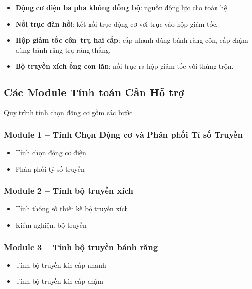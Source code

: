 \begin{itemize}
    \item \textbf{Động cơ điện ba pha không đồng bộ}: nguồn động lực cho toàn hệ.
    \item \textbf{Nối trục đàn hồi}: kết nối trục động cơ với trục vào hộp giảm tốc.
    \item \textbf{Hộp giảm tốc côn--trụ hai cấp}: cấp nhanh dùng bánh răng côn,
            cấp chậm dùng bánh răng trụ răng thẳng.
    \item \textbf{Bộ truyền xích ống con lăn}: nối trục ra hộp giảm tốc với thùng trộn.
\end{itemize}


\subsection{Các Module Tính toán Cần Hỗ trợ}

Quy trình tính chọn động cơ gồm các bước \cite{LeNhatTruong2026}

\subsubsection*{Module 1 -- Tính Chọn Động cơ và Phân phối Tỉ số Truyền}
\begin{itemize}
    \item Tính chọn động cơ điện
    \item Phân phối tỷ số truyền
\end{itemize}

\subsubsection*{Module 2 -- Tính bộ truyền xích}
\begin{itemize}
    \item Tính thông số thiết kế bộ truyền xích
    \item Kiểm nghiệm bộ truyền
\end{itemize}

\subsubsection*{Module 3 -- Tính bộ truyền bánh răng}
\begin{itemize}
    \item Tính bộ truyền kín cấp nhanh
    \item Tính bộ truyền kín cấp chậm
\end{itemize}


